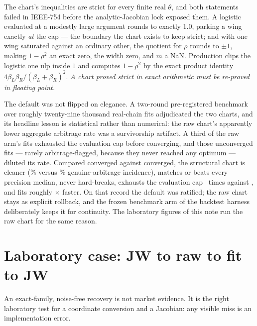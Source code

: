 \documentclass[11pt]{article}
\newcommand{\betL}{\beta_L}
\newcommand{\betR}{\beta_R}
\begin{document}
\begin{remark}
The chart's inequalities are strict for every finite real $\theta$, and both
statements failed in IEEE-754 before the analytic-Jacobian lock exposed them.
A logistic evaluated at a modestly large argument rounds to exactly $1.0$,
parking a wing exactly \emph{at} the cap --- the boundary the chart exists to
keep strict; and with one wing saturated against an ordinary other, the
quotient for $\rho$ rounds to $\pm1$, making $1-\rho^2$ an exact zero, the
width zero, and $m$ a NaN.  Production clips the logistic one ulp inside $1$
and computes $1-\rho^2$ by the exact product identity
$4\betL\betR/(\betL+\betR)^2$.  \emph{A chart proved strict in exact
arithmetic must be re-proved in floating point.}
\end{remark}

The default was not flipped on elegance.  A two-round pre-registered
benchmark over roughly twenty-nine thousand real-chain fits adjudicated the
two charts, and its headline lesson is statistical rather than numerical: the
raw chart's apparently lower aggregate arbitrage rate was a survivorship
artifact.  A third of the raw arm's fits exhausted the evaluation cap before
converging, and those unconverged fits --- rarely arbitrage-flagged, because
they never reached any optimum --- diluted its rate.  Compared converged
against converged, the structural chart is cleaner
(\svirwchartstructarb\% versus \svirwchartrawarb\% genuine-arbitrage
incidence), matches or beats every precision median, never hard-breaks,
exhausts the evaluation cap \svirwchartexhstruct\ times against
\svirwchartexhraw, and fits roughly \svirwchartspeed$\times$ faster.  On
that record the default was ratified; the raw chart stays as explicit
rollback, and the frozen benchmark arm of the backtest harness deliberately
keeps it for continuity.  The laboratory figures of this note run the raw
chart for the same reason.

\section{Laboratory case: JW to raw to fit to JW}
\label{sec:rw_case}

An exact-family, noise-free recovery is not market evidence.  It is the right
laboratory test for a coordinate conversion and a Jacobian: any visible miss is
an implementation error.
\end{document}
